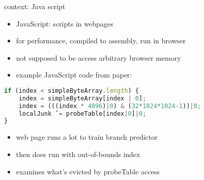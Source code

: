 \begin{frame}[fragile]{context: Java script}
\begin{itemize}
\item JavaScript: scripts in webpages
\item for performance, compiled to assembly, run in browser
\item not supposed to be access arbitrary browser memory
\item example JavaScript code from paper:
\end{itemize}
\begin{lstlisting}[language=JavaScript,style=small]
if (index < simpleByteArray.length) {
    index = simpleByteArray[index | 0];
    index = (((index * 4096)|0) & (32*1024*1024-1))|0;
    localJunk ˆ= probeTable[index|0]|0;
}
\end{lstlisting}
\begin{itemize}
\item web page runs a lot to train branch predictor
\item then does run with out-of-bounds index
\item examines what's evicted by probeTable access
\end{itemize}
\end{frame}
